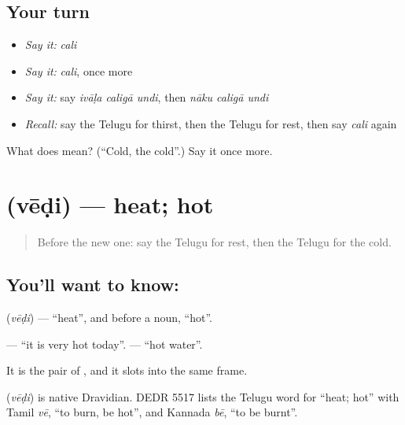 \subsection*{Your turn}
\begin{itemize}
\raggedright
  \item \emph{Say it:} \emph{cali}
  \item \emph{Say it:} \emph{cali}, once more
  \item \emph{Say it:} say \emph{ivāḷa caligā undi}, then \emph{nāku caligā undi}
  \item \emph{Recall:} say the Telugu for thirst, then the Telugu for rest, then say \emph{cali} again
\end{itemize}

\begin{tcolorbox}[breakable,colback=teal!4,colframe=teal!35!black,title={Before you move on}]
What does  mean? (\textquotedblleft{}Cold, the cold\textquotedblright{}.) Say it once more.
\end{tcolorbox}
\section[\texorpdfstring{\te{వేడి} (vēḍi)}{వేడి (vēḍi)}]{ (vēḍi) — heat; hot}

\label{lesson:TE-C85-heat}



\begin{quote}
Before the new one: say the Telugu for rest, then the Telugu for the cold.
\end{quote}

\subsection*{You'll want to know: }
\textbf{} (\emph{vēḍi}) — \textquotedblleft{}heat\textquotedblright{}, and before a noun, \textquotedblleft{}hot\textquotedblright{}.

\textbf{   } — \textquotedblleft{}it is very hot today\textquotedblright{}. \textbf{ } — \textquotedblleft{}hot water\textquotedblright{}.

It is the pair of , and it slots into the same frame.

\begin{cousinweb}
\textbf{} (\emph{vēḍi}) is native Dravidian. DEDR 5517 lists the Telugu word for \textquotedblleft{}heat; hot\textquotedblright{} with Tamil \emph{vē}, \textquotedblleft{}to burn, be hot\textquotedblright{}, and Kannada \emph{bē}, \textquotedblleft{}to be burnt\textquotedblright{}.
\end{cousinweb}

